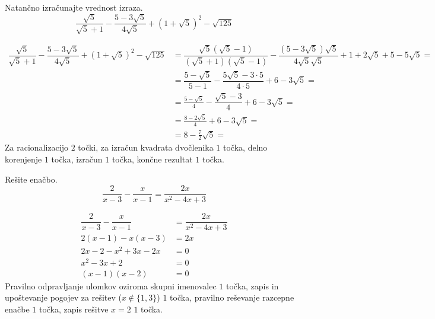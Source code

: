 \documentclass[addpoints]{exam}
\begin{document}
\begin{questions}


    \question[6]
    Natančno izračunajte vrednost izraza.
    $$ \dfrac{\sqrt{5}}{\sqrt{5}+1}-\dfrac{5-3\sqrt{5}}{4\sqrt{5}}+\left(1+\sqrt{5}\right)^2-\sqrt{125} $$

    \begin{solution}[7cm]
        \begin{align*} 
            \dfrac{\sqrt{5}}{\sqrt{5}+1}-\dfrac{5-3\sqrt{5}}{4\sqrt{5}}+\left(1+\sqrt{5}\right)^2-\sqrt{125}&=\dfrac{\sqrt{5}(\sqrt{5}-1)}{(\sqrt{5}+1)(\sqrt{5}-1)}-\dfrac{(5-3\sqrt{5})\sqrt{5}}{4\sqrt{5}\sqrt{5}}+1+2\sqrt{5}+5-5\sqrt{5}= \\
                                                                                                            &=\dfrac{5-\sqrt{5}}{5-1}-\dfrac{5\sqrt{5}-3\cdot 5}{4\cdot 5}+6-3\sqrt{5}= \\
                                                                                                            &=\frac{5-\sqrt{5}}{4}-\dfrac{\sqrt{5}-3}{4}+6-3\sqrt{5}= \\
                                                                                                            &=\frac{8-2\sqrt{5}}{4}+6-3\sqrt{5}= \\
                                                                                                            &=8-\frac{7}{2}\sqrt{5}= 
        \end{align*}
        Za racionalizacijo $2$ točki, za izračun kvadrata dvočlenika $1$ točka, delno korenjenje $1$ točka, izračun $1$ točka, končne rezultat $1$ točka.
    \end{solution}
    
    

    \question[4]
    Rešite enačbo.
    $$ \dfrac{2}{x-3}-\dfrac{x}{x-1}=\dfrac{2x}{x^2-4x+3} $$
    
    
    \begin{solution}[4cm]
        \begin{align*} 
            \dfrac{2}{x-3}-\dfrac{x}{x-1} &=\dfrac{2x}{x^2-4x+3} \\
            2(x-1)-x(x-3) &= 2x \\
            2x-2-x^2+3x-2x &=0 \\
            x^2-3x+2 &=0 \\
            (x-1)(x-2) &=0
        \end{align*}
        Pravilno odpravljanje ulomkov oziroma skupni imenovalec $1$ točka, zapis in upoštevanje pogojev za rešitev ($x\notin\{1,3\}$) $1$ točka, pravilno reševanje razcepne enačbe $1$ točka, zapis rešitve $x=2$ $1$ točka.
    \end{solution}


\end{questions}
\end{document}
